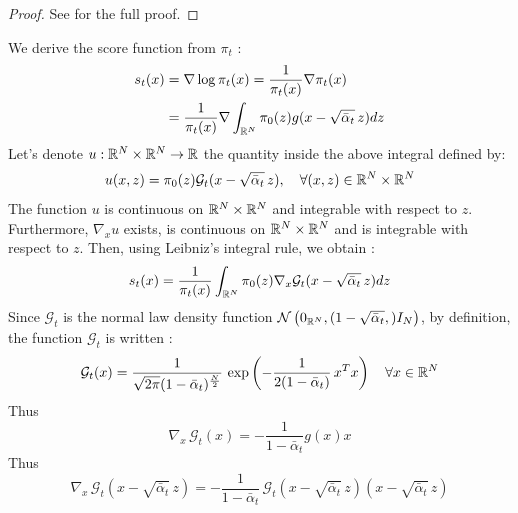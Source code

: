 \documentclass[a4paper,10pt]{article}
\begin{document}
\begin{proof}
    See  for the full proof.
\end{proof}
We derive the score function from $\pi_t$ :
\begin{align*}
        s_t(x) &= \nabla \log \pi_t(x) = \frac{1}{\pi_t(x)}\nabla\pi_t(x) \\
        &= \frac{1}{\pi_t(x)}\nabla\int_{\mathbb{R}^N} \pi_0(z) g(x - \sqrt{\bar \alpha_t} \,z) dz\\
\end{align*}
Let's denote $u: \mathbb{R}^N \times \mathbb{R}^N \rightarrow \mathbb{R}$ the quantity inside the above integral defined by:
\[u(x,z) =  \pi_0(z) \mathcal{G}_t(x - \sqrt{\bar \alpha_t}\,z), \quad \forall (x,z) \in \mathbb{R}^N \times \mathbb{R}^N\]
The function $u$ is continuous on $\mathbb{R}^N \times \mathbb{R}^N$ and integrable with respect to $z$. Furthermore, $\nabla_x u$ exists, is continuous on $\mathbb{R}^N \times \mathbb{R}^N$ and is integrable with respect to $z$. Then, using Leibniz's integral rule, we obtain :
\begin{equation}\label{eq:score_formule_premilinaire}
    s_t(x) = \frac{1}{\pi_t(x)} \int_{\mathbb{R}^N} \pi_0(z) \nabla_x \mathcal{G}_t(x - \sqrt{\bar \alpha_t} \,z) dz 
\end{equation}
Since $\mathcal{G}_t$ is the normal law density function $\mathcal{N}\left(0_{\mathbb{R}^N}, (1-\sqrt{\bar \alpha _t},)I_N\right)$, by definition, the function $\mathcal{G}_t$ is written :
\begin{equation*}
    \mathcal{G}_t(x) = \frac{1}{\sqrt{2\pi}(1-\bar \alpha_t)^{\frac{N}{2}}} \, \exp\left(-\frac{1}{2(1-\bar \alpha _t)}\,x^Tx\right) \quad \forall x \in \mathbb{R}^N
\end{equation*}
Thus
\begin{equation*}
    \nabla_x \,\mathcal{G}_t(x) = -\frac{1}{1-\bar \alpha_t}g(x)x
\end{equation*}
Thus
\begin{equation*}
    \nabla_x \,\mathcal{G}_t(x - \sqrt{\bar \alpha_t} \,z) = -\frac{1}{1-\bar \alpha_t}\,\mathcal{G}_t(x - \sqrt{\bar \alpha_t} \,z)(x - \sqrt{\bar \alpha_t} \,z)
\end{equation*}
\end{document}
